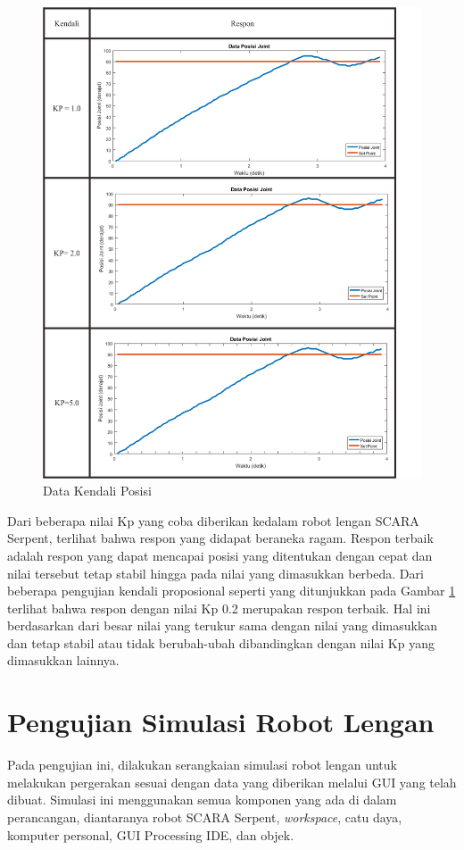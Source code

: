 \begin{figure}[H]
	\centering
	\includegraphics[width=13cm]{gambar/kendali3.png}
	\caption{Data Kendali Posisi}
	\label{pic.kendali}
\end{figure}

Dari beberapa nilai Kp yang coba diberikan kedalam robot lengan SCARA Serpent, terlihat bahwa respon yang didapat beraneka ragam. Respon terbaik adalah respon yang dapat mencapai posisi yang ditentukan dengan cepat dan nilai tersebut tetap stabil hingga pada nilai yang dimasukkan berbeda. Dari beberapa pengujian kendali proposional seperti yang ditunjukkan pada Gambar \ref{pic.kendali} terlihat bahwa respon dengan nilai Kp 0.2 merupakan respon terbaik. Hal ini berdasarkan dari besar nilai yang terukur sama dengan nilai yang dimasukkan dan tetap stabil atau tidak berubah-ubah dibandingkan dengan nilai Kp yang dimasukkan lainnya.
\section{Pengujian Simulasi Robot Lengan}
Pada pengujian ini, dilakukan serangkaian simulasi robot lengan untuk melakukan pergerakan sesuai dengan data yang diberikan melalui GUI yang telah dibuat. Simulasi ini menggunakan semua komponen yang ada di dalam perancangan, diantaranya robot SCARA Serpent, \textit{workspace}, catu daya, komputer personal, GUI Processing IDE, dan objek.

